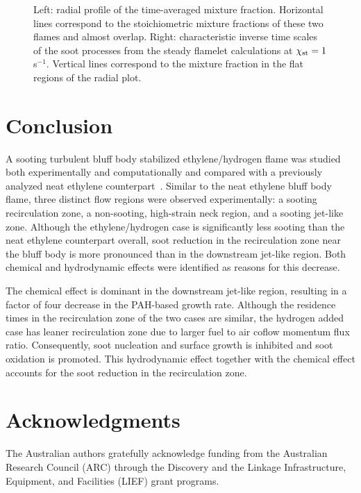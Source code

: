 \documentclass{essci}
\begin{document}
\begin{figure}[t]
  \centering
  \scriptsize
  \vspace{-0.20in}
  \resizebox{0.49\textwidth}{!}{}
  \resizebox{0.49\textwidth}{!}{}
  \vspace{-0.2in}
  \normalsize
  \caption{Left: radial profile of the time-averaged mixture fraction.  Horizontal lines correspond to the stoichiometric mixture fractions of these two flames and almost overlap.  Right: characteristic inverse time scales of the soot processes from the steady flamelet calculations at $\chi_{\rm st} = 1$ s$^{-1}$.  Vertical lines correspond to the mixture fraction in the flat regions of the radial plot.}
  \label{fig:timescale}
\end{figure}


\section{Conclusion}

A sooting turbulent bluff body stabilized ethylene/hydrogen flame was studied both experimentally and computationally and compared with a previously analyzed neat ethylene counterpart~\cite{mueller13}.  Similar to the neat ethylene bluff body flame, three distinct flow regions were observed experimentally: a sooting recirculation zone, a non-sooting, high-strain neck region, and a sooting jet-like zone.  Although the ethylene/hydrogen case is significantly less sooting than the neat ethylene counterpart overall, soot reduction in the recirculation zone near the bluff body is more pronounced than in the downstream jet-like region.  Both chemical and hydrodynamic effects were identified as reasons for this decrease.

The chemical effect is dominant in the downstream jet-like region, resulting in a factor of four decrease in the PAH-based growth rate.  Although the residence times in the recirculation zone of the two cases are similar, the hydrogen added case has leaner recirculation zone due to larger fuel to air coflow momentum flux ratio.  Consequently, soot nucleation and surface growth is inhibited and soot oxidation is promoted.  This hydrodynamic effect together with the chemical effect accounts for the soot reduction in the recirculation zone.

\section*{Acknowledgments}

The Australian authors gratefully acknowledge funding from the Australian Research Council (ARC) through the Discovery and the Linkage Infrastructure, Equipment, and Facilities (LIEF) grant programs.



\end{document}
